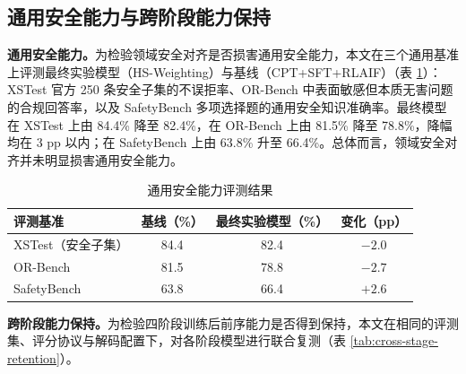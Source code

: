 \documentclass[fontset=fandol,type=master,campus=shenzhen,etitleauto=true]{hithesisbook}
\begin{document}
\subsection{通用安全能力与跨阶段能力保持}\label{cross-stage-retention}

\textbf{通用安全能力。}为检验领域安全对齐是否损害通用安全能力，本文在三个通用基准上评测最终实验模型（HS-Weighting）与基线（CPT+SFT+RLAIF）（表 \ref{tab:general-safety}）：XSTest\cite{ref49} 官方 250 条安全子集的不误拒率、OR-Bench\cite{ref50} 中表面敏感但本质无害问题的合规回答率，以及 SafetyBench\cite{ref87} 多项选择题的通用安全知识准确率。最终模型在 XSTest 上由 84.4\% 降至 82.4\%，在 OR-Bench 上由 81.5\% 降至 78.8\%，降幅均在 3 pp 以内；在 SafetyBench 上由 63.8\% 升至 66.4\%。总体而言，领域安全对齐并未明显损害通用安全能力。

\begin{table}[htbp]
\centering
\caption{通用安全能力评测结果}
\label{tab:general-safety}
\small
\renewcommand{\arraystretch}{1.15}
\begin{tabular}{l c c c}
\toprule
\textbf{评测基准} & \textbf{基线（\%）} & \textbf{最终实验模型（\%）} & \textbf{变化（pp）} \\
\midrule
XSTest（安全子集） & 84.4 & 82.4 & $-2.0$ \\
OR-Bench & 81.5 & 78.8 & $-2.7$ \\
SafetyBench & 63.8 & 66.4 & $+2.6$ \\
\bottomrule
\end{tabular}
\end{table}

\textbf{跨阶段能力保持。}为检验四阶段训练后前序能力是否得到保持，本文在相同的评测集、评分协议与解码配置下，对各阶段模型进行联合复测（表 \ref{tab:cross-stage-retention}）。
\end{document}
